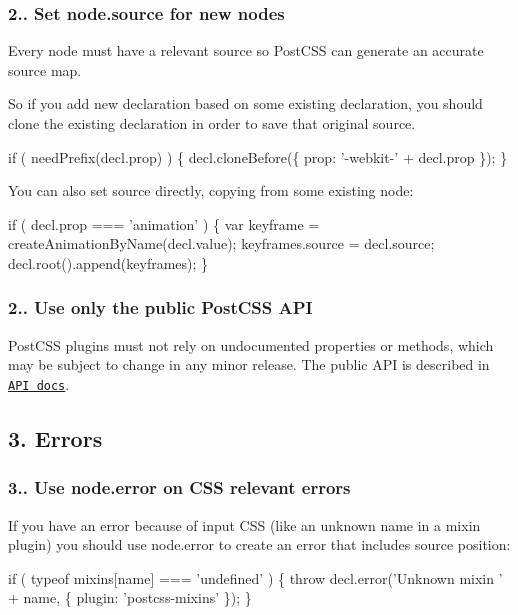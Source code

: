 \subsubsection*{2.. Set {\ttfamily node.\+source} for new nodes}

Every node must have a relevant {\ttfamily source} so Post\+C\+SS can generate an accurate source map.

So if you add new declaration based on some existing declaration, you should clone the existing declaration in order to save that original {\ttfamily source}.


\begin{DoxyCode}
if ( needPrefix(decl.prop) ) \{
    decl.cloneBefore(\{ prop: '-webkit-' + decl.prop \});
\}
\end{DoxyCode}


You can also set {\ttfamily source} directly, copying from some existing node\+:


\begin{DoxyCode}
if ( decl.prop === 'animation' ) \{
    var keyframe = createAnimationByName(decl.value);
    keyframes.source = decl.source;
    decl.root().append(keyframes);
\}
\end{DoxyCode}


\subsubsection*{2.. Use only the public Post\+C\+SS A\+PI}

Post\+C\+SS plugins must not rely on undocumented properties or methods, which may be subject to change in any minor release. The public A\+PI is described in \href{http://api.postcss.org/}{\tt A\+PI docs}.

\subsection*{3. Errors}

\subsubsection*{3.. Use {\ttfamily node.\+error} on C\+SS relevant errors}

If you have an error because of input C\+SS (like an unknown name in a mixin plugin) you should use {\ttfamily node.\+error} to create an error that includes source position\+:


\begin{DoxyCode}
if ( typeof mixins[name] === 'undefined' ) \{
    throw decl.error('Unknown mixin ' + name, \{ plugin: 'postcss-mixins' \});
\}
\end{DoxyCode}


